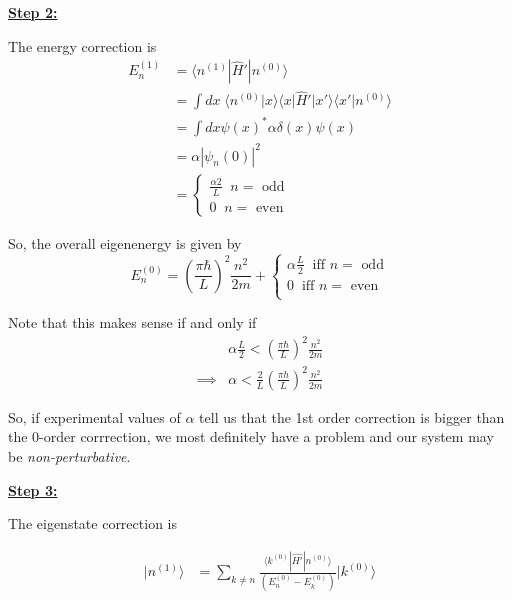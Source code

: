 \documentclass{article}
\newcommand{\ket}[1]{|#1 \rangle}
\newcommand{\inner}[2]{\langle #1 | #2 \rangle}
\begin{document}
\vskip 1cm
\underline{\textbf{Step 2:}}

\vskip 0.5cm
The energy correction is 
\begin{align*}
  E_n^{(1)} &= \inner{n^{(1)}}{\hat{H}'| n^{(0)}} \\
  &= \int dx \; \inner{n^{(0)}}{x} \inner{x}{\hat{H}'|x'}\inner{x'}{n^{(0)}} \\
  &= \int dx \psi(x)^{*} \alpha \delta(x) \psi(x) \\
  &= \alpha |\psi_n(0)|^2 \\
  &= \begin{cases}
    \frac{\alpha 2}{L} \;\;n = \text{ odd} \\
    0 \;\;n = \text{ even}
  \end{cases}
\end{align*}

So, the overall eigenenergy is given by 
\[ E_n^{(0)} = \left( \frac{\pi \hbar}{L} \right)^2 \frac{n^2}{2m} + \begin{cases}
  \alpha \frac{L}{2} \;\;\text{iff }n = \text{ odd} \\
  0 \;\;\text{iff }n = \text{ even} \\
\end{cases} \]

\vskip 0.5cm
Note that this makes sense if and only if 
\begin{align*}
  &\alpha \frac{L}{2} < \left( \frac{\pi \hbar}{L} \right)^2 \frac{n^2}{2m} \\
  \implies& \alpha < \frac{2}{L} \left( \frac{\pi h}{L} \right)^2 \frac{n^2}{2m}
\end{align*}

So, if experimental values of $\alpha$ tell us that the 1st order correction is bigger than the 0-order corrrection, we most definitely have a problem and our system may be \emph{non-perturbative}.

\vskip 1cm
\underline{\textbf{Step 3:}}

\vskip 0.5cm
The eigenstate correction is 

\begin{align*}
  \ket{n^{(1)}} &= \sum_{ k \neq n }  \frac{\inner{k^{(0)}}{\hat{H'} | n^{(0)}}}{ \left( E_n^{(0)} - E_k^{(0)} \right)} \ket{k^{(0)}}  \\
\end{align*}
\end{document}
